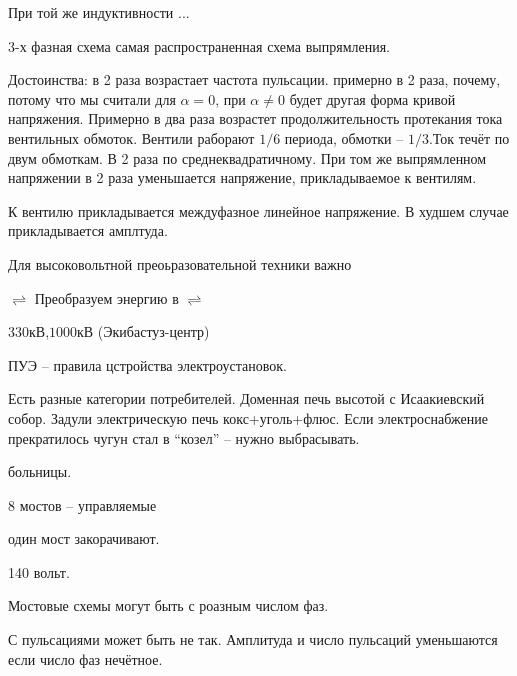 При той же индуктивности ...

3-х фазная схема самая распространенная схема выпрямления.

Достоинства: в 2 раза возрастает частота пульсации. примерно в 2 раза,
почему, потому что мы считали для $\alpha=0$, при $\alpha\ne 0$ будет 
другая форма кривой напряжения. Примерно в два раза возрастет 
продолжительность протекания тока вентильных обмоток. Вентили раборают
$1/6$ периода, обмотки -- $1/3$.Ток течёт по двум обмоткам.
В 2 раза по среднеквадратичному. При том же выпрямленном напряжении
в 2 раза уменьшается напряжение, прикладываемое к вентилям.

К вентилю прикладывается междуфазное линейное напряжение. В худшем
случае прикладывается амплтуда.

Для высоковольтной преоьразовательной техники важно

$\rightleftharpoons$ Преобразуем энергию в $\rightleftharpoons$ 


$330$кВ,$1000$кВ (Экибастуз-центр)

ПУЭ -- правила цстройства электроустановок.

Есть разные категории потребителей. Доменная печь высотой с Исаакиевский собор.
Задули электрическую печь кокс+уголь+флюс. Если электроснабжение прекратилось
чугун стал в ``козел'' -- нужно выбрасывать.

больницы.

8 мостов -- управляемые

один мост закорачивают.

140 вольт.

Мостовые схемы могут быть с роазным числом фаз.

С пульсациями может быть не так. Амплитуда и число пульсаций
уменьшаются если число фаз нечётное.



